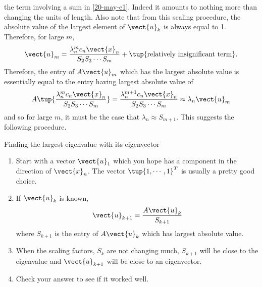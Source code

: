 the term involving a sum in \ref{20-may-e1}. Indeed it amounts to nothing more
than changing the units of length. Also note that from this scaling
procedure, the absolute value of the largest element of $\vect{u}_{k}$ is
always equal to 1. Therefore, for large $m$,
\begin{equation*}
\vect{u}_{m}=\vspace{0.05in}\frac{\lambda _{n}^{m}c_{n}\vect{x}_{n}}{S_{2}S_{3}\cdots S_{m}}+\tup{\text{relatively insignificant term}} .
\end{equation*}
Therefore, the entry of $A\vect{u}_{m}$ which has the largest absolute value
is essentially equal to the entry having largest absolute value of 
\begin{equation*}
A\tup{\vspace{0.05in}\frac{\lambda _{n}^{m}c_{n}\vect{x}_{n}}{S_{2}S_{3}\cdots S_{m}}} =\vspace{0.05in}\frac{\lambda _{n}^{m+1}c_{n}
\vect{x}_{n}}{S_{2}S_{3}\cdots S_{m}}\approx \lambda _{n}\vect{u}_{m}
\end{equation*}%
and so for large $m$, it must be the case that $\lambda _{n}\approx S_{m+1}$.
This suggests the following procedure.

\begin{procedure}{Finding the largest eigenvalue with its eigenvector}{}
\begin{enumerate}
\item Start with a vector $\vect{u}_{1}$ which you hope has a component in
the direction of $\vect{x}_{n}$. The vector $\tup{1,\cdots ,1} ^{T}$
is usually a pretty good choice.

\item If $\vect{u}_{k}$ is known, 
\begin{equation*}
\vect{u}_{k+1}=\frac{A\vect{u}_{k}}{S_{k+1}}
\end{equation*}
where $S_{k+1}$ is the entry of $A\vect{u}_{k}$ which has largest absolute
value.

\item When the scaling factors, $S_{k}$ are not changing much, $S_{k+1}$
will be close to the eigenvalue and $\vect{u}_{k+1}$ will be close to an
eigenvector.

\item Check your answer to see if it worked well.
\end{enumerate}
\end{procedure}

